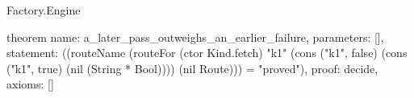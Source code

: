 \begin{lexlean}{Factory.Engine}
\begin{semanticmodule}
theorem{
  name: a_later_pass_outweighs_an_earlier_failure,
  parameters: [],
  statement: ((routeName (routeFor (ctor Kind.fetch) "k1" (cons ("k1", false) (cons ("k1", true) (nil (String * Bool)))) (nil Route))) = "proved"),
  proof: decide{},
  axioms: []
}
\end{semanticmodule}
\end{lexlean}
